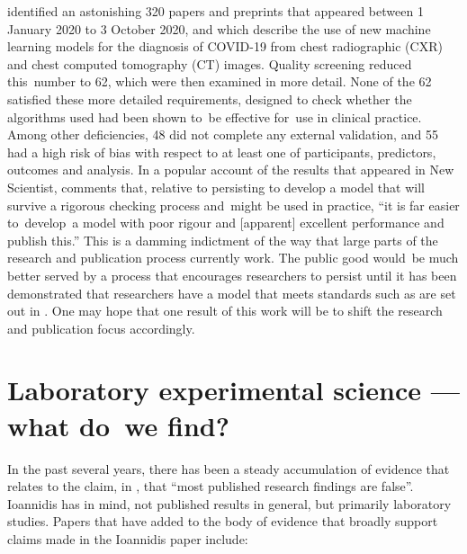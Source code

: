 \documentclass[
  10pt,
  b5paper]{book}
\begin{document}
\citet{roberts2021common} identified an astonishing 320 papers and preprints
that appeared between 1 January 2020 to 3 October 2020, and which
describe the use of new machine learning models for the diagnosis of
COVID-19 from chest radiographic (CXR) and chest computed tomography
(CT) images. Quality screening reduced this~number to 62, which were
then examined in more detail. None of the 62 satisfied these more
detailed requirements, designed to check whether the algorithms used
had been shown to~be effective for~use in clinical practice. Among
other deficiencies, 48 did not complete any external validation, and
55 had a high risk of bias with respect to at least one of
participants, predictors, outcomes and analysis. In a popular account
of the results that appeared in New Scientist, \citet{roberts2021machine}
comments that, relative
to persisting to develop a model that will survive a rigorous
checking process and~might be used in practice, ``it is far easier
to~develop~a model with poor rigour and {[}apparent{]} excellent
performance and publish this.'' This is a damming indictment of
the way that large parts of the research and publication process
currently work. The public good would~be much better served
by a process that encourages researchers to persist until it
has been demonstrated that researchers have a model that meets
standards such as are set out in \citet{roberts2021common}. One may
hope that one result of this work will be to shift the research
and publication focus accordingly.

\hypertarget{laboratory-experimental-science-what-do-we-find}{%
\section{Laboratory experimental science --- what do~we find?}\label{laboratory-experimental-science-what-do-we-find}}

In the past several years, there has been a steady accumulation
of evidence that relates to the claim, in \citet{r19_ioannidis_2005},
that ``most published research findings are false''. Ioannidis
has in mind, not published results in general, but primarily
laboratory studies. Papers that have added to the
body of evidence that broadly support claims made in the
Ioannidis paper include:
\end{document}
